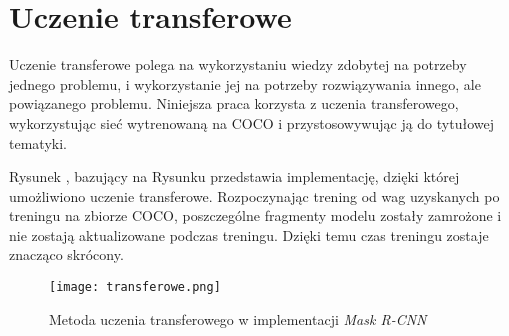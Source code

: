 \newpage
\section{Uczenie transferowe}
\label{sec:uczenie-transferowe}

Uczenie transferowe polega na wykorzystaniu wiedzy zdobytej na potrzeby jednego problemu, i wykorzystanie jej na potrzeby rozwiązywania innego, ale powiązanego problemu.
Niniejsza praca korzysta z uczenia transferowego, wykorzystując sieć wytrenowaną na COCO i przystosowywując ją do tytułowej tematyki.

Rysunek , bazujący na Rysunku  przedstawia implementację, dzięki której umożliwiono uczenie transferowe. Rozpoczynając trening od wag uzyskanych po treningu na zbiorze COCO, poszczególne fragmenty modelu zostały zamrożone i nie zostają aktualizowane podczas treningu. Dzięki temu czas treningu zostaje znacząco skrócony.

\begin{figure}[h]
  \centering
  \caption{Metoda uczenia transferowego w implementacji \textit{Mask R-CNN}}
  \texttt{[image: transferowe.png]}
  \label{fig:transferowe}
\end{figure}
